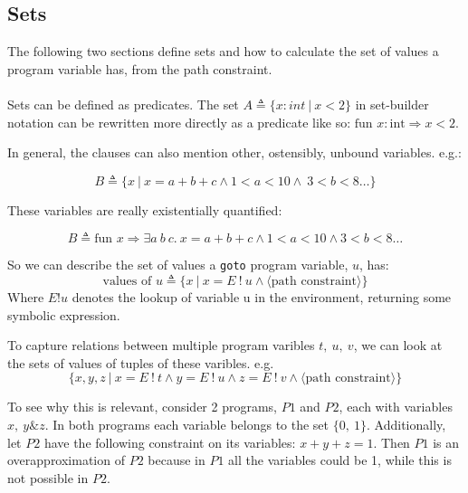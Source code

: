 \documentclass[12pt]{report}
\begin{document}
\subsection{Sets}




      The following two sections define sets and how to calculate
      the set of values a program variable has, from the path constraint.\\


      \\


      Sets can be defined as predicates.
      The set $A \triangleq \{x: int\ |\ x < 2\}$ in set-builder
      notation can be rewritten more directly as a predicate
      like so: $\text{fun } x: \text{int} \Rightarrow x < 2$.


      In general, the clauses can also mention other, ostensibly,
      unbound variables. e.g.:


      \[B \triangleq \{x\ |\ x = a + b + c \land 1 < a < 10 \land \ 
      3 < b < 8 \ldots \}\]


      These variables are really existentially quantified:


      \[B \triangleq \text{fun } x \Rightarrow \exists a\ b\ c. \
      x = a + b + c \land 1 < a < 10 \land 3 < b < 8 \ldots \]


      So we can describe the set of values a \texttt{goto} program
      variable, $u$, has:
      \[\text{values of } u \triangleq \{x\ |\ x = E\ !\ u \land \langle \text{path constraint} \rangle\}\]
      Where $E ! u$ denotes the lookup of variable u in the environment, returning some symbolic expression.


      To capture relations between multiple program varibles $t,\ u,\ v$,
      we can look at the sets of values of tuples of these varibles. e.g.
      \[ \{ x, y, z\ |\ x = E\ !\ t \land y = E\ !\ u \land z = E\ !\ v \land \langle \text{path constraint} \rangle\}\]


      To see why this is relevant, consider 2 programs, $P1$ and $P2$, each with variables $x,\ y \& z$.
      In both programs each variable belongs to the set $\{0,\ 1\}$. Additionally, let $P2$ have the following
      constraint on its variables: $x+y+z=1$. Then $P1$ is an overapproximation of $P2$ because in $P1$
      all the variables could be 1, while this is not possible in $P2$.
\end{document}
